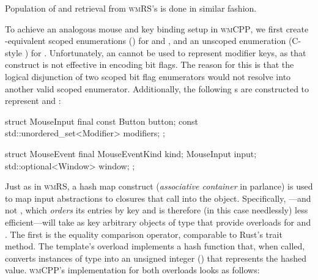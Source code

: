 Population of and retrieval from \textsc{wmRS}'s 
 is done in similar fashion.


To achieve an analogous mouse and key binding setup in \textsc{wmCPP}, we
first create \cpp{}-equivalent scoped enumerations () for
 and , and an unscoped enumeration (C-style
) for . Unfortunately, an  cannot
be used to represent modifier keys, as that construct is not effective in
encoding bit flags. The reason for this is that the logical disjunction of
two scoped bit flag enumerators would not resolve into another valid scoped
enumerator. Additionally, the following s are constructed to
represent  and :

\begin{cppblock}
  struct MouseInput final {
    const Button button;
    const std::unordered_set<Modifier> modifiers;
  };
\end{cppblock}
\begin{cppblock}
  struct MouseEvent final {
    MouseEventKind kind;
    MouseInput input;
    std::optional<Window> window;
  };
\end{cppblock}

Just as in \textsc{wmRS}, a hash map construct (\textit{associative container}
in \cpp parlance) is used to map input abstractions to closures that call into
the  object. Specifically, ---and not
, which \textit{orders} its entries by key and is therefore
(in this case needlessly) less efficient---will take as key arbitrary
objects of type  that provide overloads for  and
. The first is the equality comparison operator,
comparable to Rust's  trait method. The 
template's  overload implements a hash function that,
when called, converts instances of type  into an unsigned integer
() that represents the hashed value. \textsc{wmCPP}'s
implementation for both overloads looks as follows:

